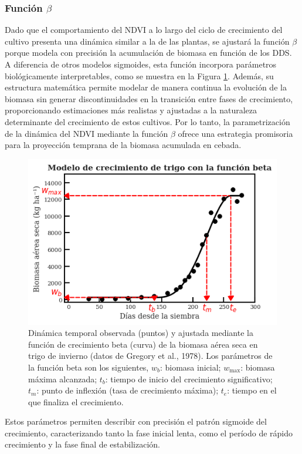 \documentclass[
11pt, %
]{charter}
\begin{document}
\subsubsection{Función $\beta$}
\label{sec:descripcion}

Dado que el comportamiento del NDVI a lo largo del ciclo de crecimiento del cultivo presenta una dinámica similar a la de las plantas, se ajustará la función $\beta$ porque modela con precisión la acumulación de biomasa en función de los DDS. A diferencia de otros modelos sigmoides, esta función incorpora parámetros biológicamente interpretables, como se muestra en la Figura \ref{fig:Curva_Beta }. Además, su estructura matemática permite modelar de manera continua la evolución de la biomasa sin generar discontinuidades en la transición entre fases de crecimiento, proporcionando estimaciones más realistas y ajustadas a la naturaleza determinante del crecimiento de estos cultivos. Por lo tanto, la parametrización de la dinámica del NDVI mediante la función $\beta$ ofrece una estrategia promisoria para la proyección temprana de la biomasa acumulada en cebada.

\begin{figure}[htpb]
    \centering
    \includegraphics[width=.5\textwidth]{./Figuras/Curva_Beta.png}
    \caption{Dinámica temporal observada (puntos) y ajustada mediante la función de crecimiento beta (curva) de la biomasa aérea seca en trigo de invierno (datos de Gregory et al., 1978). Los parámetros de la función beta son los siguientes, $w_b$: biomasa inicial; $w_{\max}$: biomasa máxima alcanzada; $t_b$: tiempo de inicio del crecimiento significativo; $t_m$: punto de inflexión (tasa de crecimiento máxima); $t_e$: tiempo en el que finaliza el crecimiento.}
    \label{fig:Curva_Beta }
\end{figure}



Estos parámetros permiten describir con precisión el patrón sigmoide del crecimiento, caracterizando tanto la fase inicial lenta, como el período de rápido crecimiento y la fase final de estabilización. 
\end{document}
